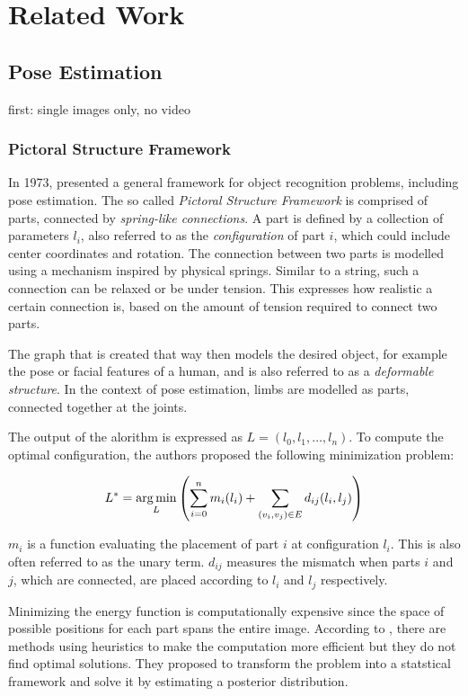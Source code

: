 \chapter{Related Work}

\section{Pose Estimation}
first: single images only, no video
\subsection{Pictoral Structure Framework}
In 1973, \cite{fischler_representation_1973} presented a general framework for object recognition problems, including pose estimation.
The so called \textit{Pictoral Structure Framework} is comprised of parts, connected by \textit{spring-like connections}.
A part is defined by a collection of parameters $l_i$, also referred to as the \textit{configuration} of part $i$, which could include center coordinates and rotation.
The connection between two parts is modelled using a mechanism inspired by physical springs.
Similar to a string, such a connection can be relaxed or be under tension.
This expresses how realistic a certain connection is, based on the amount of tension required to connect two parts.

The graph that is created that way then models the desired object, for example the pose or facial features of a human, and is also referred to as a \textit{deformable structure}.
In the context of pose estimation, limbs are modelled as parts, connected together at the joints.

The output of the alorithm is expressed as $L = (l_0, l_1, \dots, l_n)$.
To compute the optimal configuration, the authors proposed the following minimization problem:

\begin{equation}
    \label{eq:energy-minimization}
    L^* = \operatorname*{arg\,min}_L \left(\sum_{i=0}^n m_i(l_i) + \sum_{(v_i, v_j) \in E} d_{ij}(l_i, l_j)\right)
\end{equation}

$m_i$ is a function evaluating the placement of part $i$ at configuration $l_i$.
This is also often referred to as the unary term.
$d_{ij}$ measures the mismatch when parts $i$ and $j$, which are connected, are placed according to $l_i$ and $l_j$ respectively.

Minimizing the energy function is computationally expensive since the space of possible positions for each part spans the entire image.
According to \cite{felzenszwalb_pictorial_2005}, there are methods using heuristics to make the computation more efficient but they do not find optimal solutions.
They proposed to transform the problem into a statstical framework and solve it by estimating a posterior distribution.

